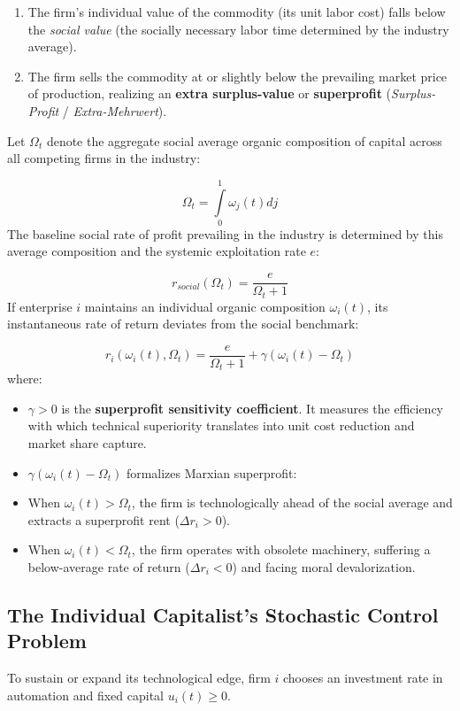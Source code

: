 \documentclass[11pt,letterpaper]{report}
\begin{document}
\begin{enumerate}
\item The firm's individual value of the commodity (its unit labor cost) falls below the \emph{social value} (the socially necessary labor time determined by the industry average).
\item The firm sells the commodity at or slightly below the prevailing market price of production, realizing an \textbf{extra surplus-value} or \textbf{superprofit} (\emph{Surplus-Profit} / \emph{Extra-Mehrwert}).
\end{enumerate}
Let ${\Omega }_{t}$ denote the aggregate social average organic composition of capital across all competing firms in the industry:

\[
{\Omega }_{t}=\int\limits_{0}^{1}{\omega }_{j}(t)dj
\]
The baseline social rate of profit prevailing in the industry is determined by this average composition and the systemic exploitation rate $e$:

\[
{r}_{social}({\Omega }_{t})=\frac{e}{{\Omega }_{t}+1}
\]
If enterprise $i$ maintains an individual organic composition ${\omega }_{i}(t)$, its instantaneous rate of return deviates from the social benchmark:

\[
{r}_{i}({\omega }_{i}(t),{\Omega }_{t})=\frac{e}{{\Omega }_{t}+1}+\gamma \left({{\omega }_{i}(t)-{\Omega }_{t}}\right)
\]
where:

\begin{itemize}
\item $\gamma >0$ is the \textbf{superprofit sensitivity coefficient}. It measures the efficiency with which technical superiority translates into unit cost reduction and market share capture.
\item $\gamma ({\omega }_{i}(t)-{\Omega }_{t})$ formalizes Marxian superprofit:
\item When ${\omega }_{i}(t)>{\Omega }_{t}$, the firm is technologically ahead of the social average and extracts a superprofit rent ($\Delta {r}_{i}>0$).
\item When ${\omega }_{i}(t)<{\Omega }_{t}$, the firm operates with obsolete machinery, suffering a below-average rate of return ($\Delta {r}_{i}<0$) and facing moral devalorization.
\end{itemize}
\subsection{The Individual Capitalist's Stochastic Control Problem}
To sustain or expand its technological edge, firm $i$ chooses an investment rate in automation and fixed capital ${u}_{i}(t)\geq 0$.
\end{document}
